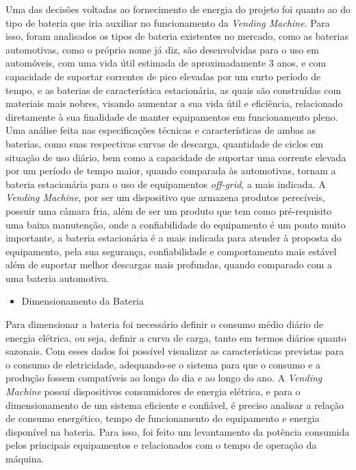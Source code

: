 		Uma das decisões voltadas ao fornecimento de energia do projeto foi quanto ao do tipo de bateria que iria auxiliar no funcionamento da \textit{Vending Machine}. Para isso, foram analisados os tipos de bateria existentes no mercado, como as baterias automotivas, como o próprio nome já diz, são desenvolvidas para o uso em automóveis, com uma vida útil estimada de aproximadamente 3 anos, e com capacidade de suportar correntes de pico elevadas por um curto período de tempo, e as baterias de característica estacionária, as quais são construídas com materiais mais nobres, visando aumentar a sua vida útil e eficiência, relacionado diretamente à sua finalidade de manter equipamentos em funcionamento pleno. 
    	Uma análise feita nas especificações técnicas e características de ambas as baterias, como suas respectivas curvas de descarga, quantidade de ciclos em situação de uso diário, bem como a capacidade de suportar uma corrente elevada por um período de tempo maior, quando comparada às automotivas, tornam a bateria estacionária para o uso de equipamentos\textit{ off-grid}, a mais indicada.
   		A \textit{Vending Machine}, por ser um dispositivo que armazena produtos perecíveis, possuir uma câmara fria, além de ser um produto que tem como pré-requisito uma baixa manutenção, onde a confiabilidade do equipamento é um ponto muito importante, a bateria estacionária é a mais indicada para atender à proposta do equipamento, pela sua segurança, confiabilidade e comportamento mais estável além de suportar melhor descargas mais profundas, quando comparado com a uma bateria automotiva.
        
\begin{itemize}
\item Dimensionamento da Bateria
\end{itemize}

Para dimensionar a bateria foi necessário definir o consumo médio diário de energia elétrica, ou seja, definir a curva de carga, tanto em termos diários quanto sazonais. Com esses dados foi possível visualizar as características previstas para o consumo de eletricidade, adequando-se o sistema para que o consumo e a produção fossem compatíveis ao longo do dia e ao longo do ano. 
		A \textit{Vending Machine} possui dispositivos consumidores de energia elétrica, e para o dimensionamento de um sistema eficiente e confiável, é preciso analisar a relação de consumo energético, tempo de funcionamento do equipamento e energia disponível na bateria. Para isso, foi feito um levantamento da potência consumida pelos principais equipamentos e relacionados com o tempo de operação da máquina.
        
